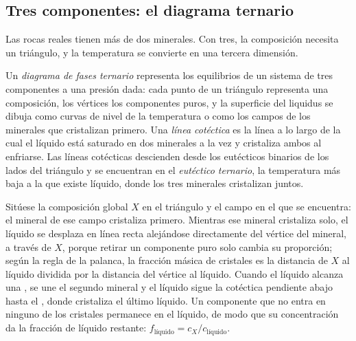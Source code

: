 \subsection*{Tres componentes: el diagrama ternario}

Las rocas reales tienen más de dos minerales. Con tres, la composición necesita un
triángulo, y la temperatura se convierte en una tercera dimensión.

\begin{definition}\label{def:b2:mantle-melting:ternary}
Un \emph{diagrama de fases ternario} representa los
equilibrios de un sistema de tres componentes a una presión dada: cada punto de un
triángulo representa una composición, los vértices los componentes puros, y la
superficie del liquidus se dibuja como curvas de nivel de la temperatura o como los campos de los
minerales que cristalizan primero. Una \emph{línea cotéctica} es
la línea a lo largo de la cual el líquido está saturado en dos minerales a la vez y
cristaliza ambos al enfriarse. Las líneas cotécticas descienden desde los eutécticos
binarios de los lados del triángulo y se encuentran en el \emph{eutéctico
ternario}, la temperatura más baja a la que existe líquido,
donde los tres minerales cristalizan juntos.
\end{definition}

\begin{method}\label{met:b2:mantle-melting:ternary}
Sitúese la composición global $X$ en el triángulo y el campo en el que se encuentra:
el mineral de ese campo cristaliza primero. Mientras ese mineral cristaliza solo,
el líquido se desplaza en línea recta alejándose directamente del vértice del mineral,
a través de $X$, porque retirar un componente puro solo cambia su proporción; según la
regla de la palanca, la fracción másica de cristales es la distancia de $X$ al líquido
dividida por la distancia del vértice al líquido. Cuando el líquido alcanza una
, se une el segundo mineral y el líquido sigue la cotéctica
pendiente abajo hasta el , donde cristaliza el último líquido. Un componente
que no entra en ninguno de los cristales permanece en el líquido, de modo que su concentración da
la fracción de líquido restante: $f_{\text{líquido}} = c_X/c_{\text{líquido}}$.
\end{method}

